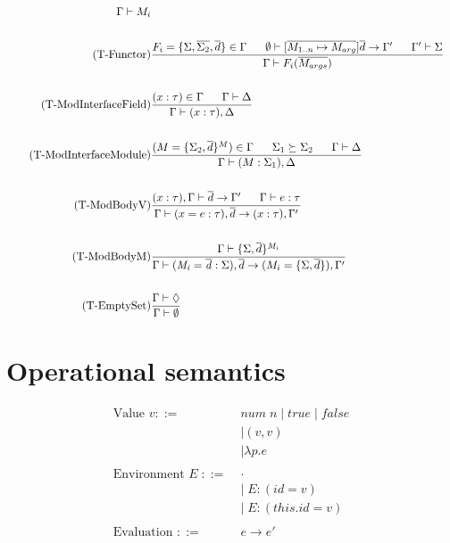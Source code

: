 \documentclass[10pt,a4paper,draft]{article}
\begin{document}
\begin{flushleft}
\begin{align*}
{\Gamma \vdash M_{i}} \\
\\
\tag{T-Functor}
&\frac{F_{i}=\lbrace\Sigma,\overline{\Sigma_{2}},\overline{d}\rbrace \in \Gamma
\;\;\;\;\;\;
\emptyset \vdash [\overline{M_{1..n} \mapsto M_{arg}}]\overline{d} \rightarrow \Gamma' \;\;\;\;\;\; \Gamma' \vdash \Sigma}
{\Gamma \vdash F_{i}(\overline{M_{args}})}\\
\\
\tag{T-ModInterfaceField}
&\frac{(x:\tau) \in \Gamma \;\;\;\;\;\; \Gamma \vdash \Delta}
{\Gamma \vdash (x:\tau),\Delta}\\
\\
\tag{T-ModInterfaceModule}
&\frac{(M=\lbrace \Sigma_{2}, \overline{d} \rbrace^{M}) \in \Gamma
\;\;\;\;\;\; \Sigma_{1} \succeq \Sigma_{2} 
\;\;\;\;\;\; \Gamma \vdash \Delta}
{\Gamma \vdash (M:\Sigma_{1}),\Delta}\\
\\
\tag{T-ModBodyV}
&\frac{ (x:\tau),\Gamma \vdash \overline{d} \rightarrow \Gamma' \;\;\;\;\;\; \Gamma \vdash e:\tau}
{\Gamma \vdash (x=e:\tau),\overline{d} \rightarrow (x:\tau),\Gamma'} \\
\\
\tag{T-ModBodyM}
&\frac{\Gamma \vdash \lbrace\Sigma, \overline{d} \rbrace^{M_{i}} }
{\Gamma \vdash (\mathit{M_{i}=\overline{d}}:\Sigma),\overline{d} \rightarrow (M_{i}=\lbrace \Sigma,\overline{d} \rbrace),\Gamma'} \\
\\
\tag{T-EmptySet}
&\frac{\Gamma \vdash \Diamond}
{\Gamma \vdash \emptyset}
\end{align*}

\section{Operational semantics}
\begin{align*}
\text{Value }v ::=\;&\mathit{num\;n} \; | \; \mathit{true} \; | \; \mathit{false} \\
&| (v,v) \\
&| \lambda p.e\\
\\
\text{Environment } E\; ::= \;&\cdot \\
&|\;E:(\mathit{id}=v) \\
&|\;E:(\mathit{this.id}=v) \\ 
\\
\text{Evaluation } ::= &e \rightarrow e' \\
\end{align*}

\end{flushleft}
\end{document}
